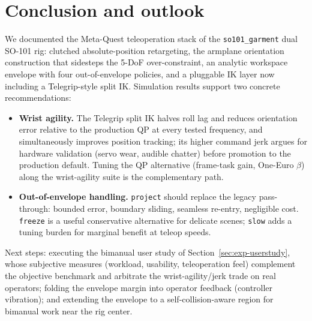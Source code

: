 \section{Conclusion and outlook}
\label{sec:conclusion}

We documented the Meta-Quest teleoperation stack of the
\texttt{so101\_garment} dual SO-101 rig: clutched absolute-position
retargeting, the armplane orientation construction that sidesteps the 5-DoF
over-constraint, an analytic workspace envelope with four out-of-envelope
policies, and a pluggable IK layer now including a Telegrip-style split IK.
Simulation results support two concrete recommendations:
\begin{itemize}
  \item \textbf{Wrist agility.} The Telegrip split IK halves roll lag and
  reduces orientation error relative to the production QP at every tested
  frequency, and simultaneously improves position tracking; its higher
  command jerk argues for hardware validation (servo wear, audible
  chatter) before promotion to the production default. Tuning the QP
  alternative (frame-task gain, One-Euro \(\beta\)) along the wrist-agility
  suite is the complementary path.
  \item \textbf{Out-of-envelope handling.} \texttt{project} should replace
  the legacy pass-through: bounded error, boundary sliding, seamless
  re-entry, negligible cost. \texttt{freeze} is a useful conservative
  alternative for delicate scenes; \texttt{slow} adds a tuning burden for
  marginal benefit at teleop speeds.
\end{itemize}
Next steps: executing the bimanual user study of
Section~\ref{sec:exp-userstudy}, whose subjective measures (workload,
usability, teleoperation feel) complement the objective benchmark and
arbitrate the wrist-agility/jerk trade on real operators; folding the
envelope margin into operator feedback (controller vibration); and
extending the envelope to a self-collision-aware region for bimanual work
near the rig center.
